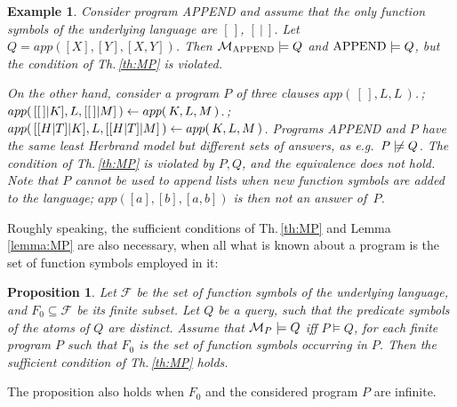 \documentclass[a4paper]{tlp2}
\newtheorem{proposition}[theorem]{Proposition}
\newtheorem{example}[theorem]{Example}
\newcommand*{\notmodels}{\mathrel{\,\not\!\models}}
\newcommand*{\M}{{\ensuremath{\cal M}}\xspace}
\newcommand*{\F}{{\ensuremath{\mathscr F}}\xspace}
\begin{document}
\begin{example}


\noindent
Consider program APPEND and assume that the only function symbols of the
underlying language are $[\,]$, 
$[\  |\ ]$.
 Let $Q=app( [X], [Y], [X,Y] )$.
Then $\M_{\rm APPEND}\models Q$ and ${\rm APPEND}\models Q$, 
but the condition of Th.\,\ref{th:MP} is violated.

On the other hand, consider a program $P$ of three clauses 
$  app(\,[\,],L,L\,)$.\,;
{\small
$app(\,[[\,]|K],L,[[\,]|M]\,) \gets \linebreak[3] app(\,K,L,M\,)$.\,;
\hspace{0pt plus .5ex}$app(\,[[H|T]|K],L,[[H|T]|M]\,) \gets \linebreak[3]  app(\,K,L,M\,)$.
}
Programs \mbox{APPEND} and $P$ have the same least Herbrand model but
different sets of answers,
as e.g.\ $P\notmodels Q$.
The condition of Th.\,\ref{th:MP} is violated by $P,Q$, and the equivalence
does not hold.
Note that $P$ cannot be used to append lists when new function symbols are
added to the language; $app([a],[b],[a,b])$ is then not an answer of~$P$.
\sloppy
\end{example}






Roughly speaking, 
the sufficient conditions of Th.\,\ref{th:MP} and Lemma \ref{lemma:MP}
are also necessary, 
when all what is known about a program is the set of function
symbols employed in it:


\begin{proposition}
\label{prop:counterexample}
Let $\F$ be the set of function symbols of the underlying language, and
$F_0\subseteq \F$ be its finite subset.
Let $Q$ be a query, 
such that the predicate symbols of the atoms of $Q$ are distinct.
Assume that  $\M_P\models Q$ iff $P\models Q$, for each finite program $P$
such that 
$F_0$ is the set of function symbols occurring in $P$.  Then the 
sufficient condition of Th.\,\ref{th:MP} holds.
\end{proposition}
The proposition also holds when $F_0$ and the considered program $P$ are
infinite. 
\end{document}
